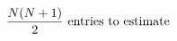 \documentclass[preview]{standalone}
\begin{document}
\begin{align*}
\special{dvisvgm:raw <g id='unique000'>}\frac{N(N+1)}{2} \text{ entries to estimate}\special{dvisvgm:raw </g>}
\end{align*}
\end{document}
